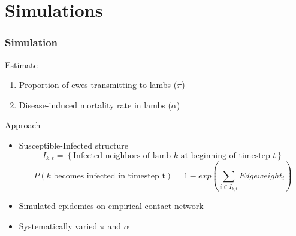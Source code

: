 \documentclass[fleqn,xcolor=table]{beamer}
\begin{document}
\section{Simulations}
\begin{frame}[t]
	\frametitle{\color{darkred} Simulation}
\footnotesize \color{navy}Estimate
\begin{enumerate}
	\item{\footnotesize \color{navy}Proportion of ewes transmitting to
		lambs ($\pi$)}
	\item{\footnotesize \color{navy}Disease-induced mortality rate in lambs
		($\alpha$)} 
\end{enumerate}

\vspace{.2in}
{\color{navy} Approach}
{\footnotesize
	\begin{itemize}
		\item \scriptsize
			\color{darkred}S\color{navy}usceptible-\color{darkred}I\color{navy}nfected structure
			\[I_{k, t} = \left\{\text{Infected neighbors
			of lamb }k \text{ at beginning of timestep }
	t\right\}\] \[P(k \text{ becomes infected in timestep t}) = 1-exp\left(\sum_{i \in
			I_{k, t}}Edgeweight_i\right)\]
		\item \scriptsize \color{navy}Simulated epidemics on empirical contact network
		\item \scriptsize \color{navy}Systematically varied $\pi$ and $\alpha$
%		
	\end{itemize}
}
\end{frame}
\end{document}
